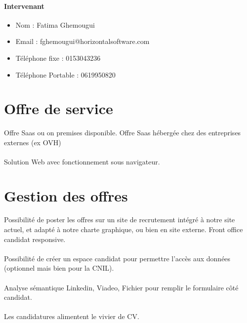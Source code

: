 \paragraph{Intervenant}
\begin{itemize}
	\item Nom : Fatima Ghemougui
	\item Email : fghemougui@horizontalsoftware.com
	\item Téléphone fixe : 0153043236
	\item Téléphone Portable : 0619950820  
\end{itemize}

\section{Offre de service}
\paragraph{} Offre Saas ou on premises disponible. Offre Saas hébergée chez des entreprises externes (ex OVH)
\paragraph{} Solution Web avec fonctionnement sous navigateur.

\section{Gestion des offres}
\paragraph{} Possibilité de poster les offres sur un site de recrutement intégré à notre site actuel, et adapté à notre charte graphique, ou bien en site externe. Front office candidat responsive.
\paragraph{} Possibilité de créer un espace candidat pour permettre l’accès aux données (optionnel mais bien pour la CNIL).
\paragraph{} Analyse sémantique Linkedin, Viadeo, Fichier pour remplir le formulaire côté candidat.
\paragraph{} Les candidatures alimentent le vivier de CV.
